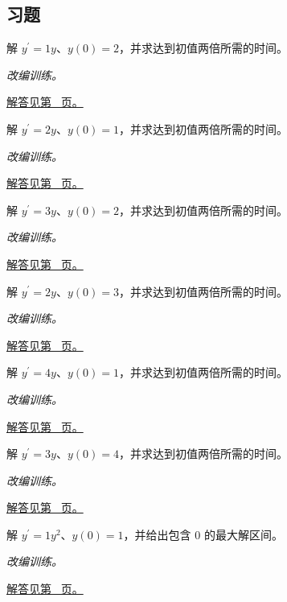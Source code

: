 \documentclass[12pt,fontset=fandol]{ctexart}
\begin{document}
\subsection{习题}
\begin{example}[指数增长初值问题]\label{ex:c22q1}
解 $y^{\prime}=1y$、$y(0)=2$，并求达到初值两倍所需的时间。
\par\textit{改编训练。}\par\hyperref[ans:c22q1]{解答见第~\pageref{ans:c22q1} 页。}
\end{example}
\begin{example}[指数增长初值问题]\label{ex:c22q2}
解 $y^{\prime}=2y$、$y(0)=1$，并求达到初值两倍所需的时间。
\par\textit{改编训练。}\par\hyperref[ans:c22q2]{解答见第~\pageref{ans:c22q2} 页。}
\end{example}
\begin{example}[指数增长初值问题]\label{ex:c22q3}
解 $y^{\prime}=3y$、$y(0)=2$，并求达到初值两倍所需的时间。
\par\textit{改编训练。}\par\hyperref[ans:c22q3]{解答见第~\pageref{ans:c22q3} 页。}
\end{example}
\begin{example}[指数增长初值问题]\label{ex:c22q4}
解 $y^{\prime}=2y$、$y(0)=3$，并求达到初值两倍所需的时间。
\par\textit{改编训练。}\par\hyperref[ans:c22q4]{解答见第~\pageref{ans:c22q4} 页。}
\end{example}
\begin{example}[指数增长初值问题]\label{ex:c22q5}
解 $y^{\prime}=4y$、$y(0)=1$，并求达到初值两倍所需的时间。
\par\textit{改编训练。}\par\hyperref[ans:c22q5]{解答见第~\pageref{ans:c22q5} 页。}
\end{example}
\begin{example}[指数增长初值问题]\label{ex:c22q6}
解 $y^{\prime}=3y$、$y(0)=4$，并求达到初值两倍所需的时间。
\par\textit{改编训练。}\par\hyperref[ans:c22q6]{解答见第~\pageref{ans:c22q6} 页。}
\end{example}
\begin{example}[分离变量与有限时刻发散]\label{ex:c22q7}
解 $y^{\prime}=1y^2$、$y(0)=1$，并给出包含 $0$ 的最大解区间。
\par\textit{改编训练。}\par\hyperref[ans:c22q7]{解答见第~\pageref{ans:c22q7} 页。}
\end{example}
\end{document}

